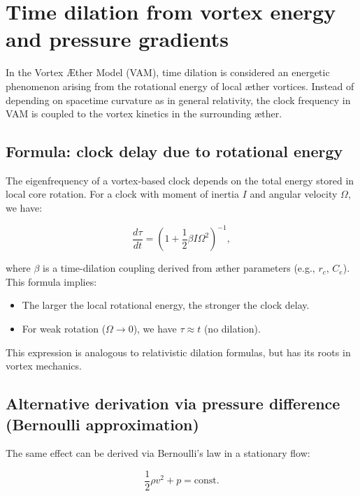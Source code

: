 \section{Time dilation from vortex energy and pressure gradients}\label{sec:appendix:5}

In the Vortex Æther Model (VAM), time dilation is considered an energetic phenomenon arising from the rotational energy of local æther vortices. Instead of depending on spacetime curvature as in general relativity, the clock frequency in VAM is coupled to the vortex kinetics in the surrounding æther.

\subsection{Formula: clock delay due to rotational energy}

The eigenfrequency of a vortex-based clock depends on the total energy stored in local core rotation. For a clock with moment of inertia $I$ and angular velocity $\Omega$, we have:

\begin{equation}
    \frac{d\tau}{dt} = \left(1 + \frac{1}{2} \beta I \Omega^2 \right)^{-1},
\end{equation}

where $\beta$ is a time-dilation coupling derived from æther parameters (e.g., $r_c$, $C_e$). This formula implies:

\begin{itemize}
    \item The larger the local rotational energy, the stronger the clock delay.
    \item For weak rotation ($\Omega \to 0$), we have $\tau \approx t$ (no dilation).
\end{itemize}

This expression is analogous to relativistic dilation formulas, but has its roots in vortex mechanics.

\subsection{Alternative derivation via pressure difference (Bernoulli approximation)}

The same effect can be derived via Bernoulli's law in a stationary flow:

\begin{equation}
    \frac{1}{2} \rho v^2 + p = \text{const.}
\end{equation}

